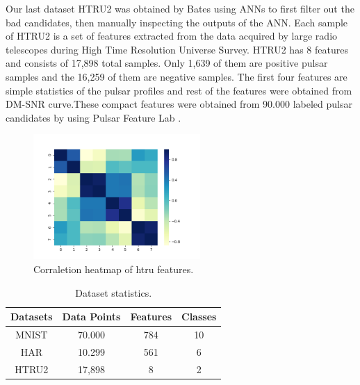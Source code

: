 \documentclass[journal]{IEEEtran}
\begin{document}
  Our last dataset HTRU2 was obtained by Bates\cite{bates2012high} using ANNs to first filter out the bad candidates, then manually inspecting the outputs of the ANN. Each sample of HTRU2 is a set of features extracted from the data acquired by large radio telescopes during High Time Resolution Universe Survey. HTRU2 has 8 features and consists of 17,898 total samples. Only 1,639 of them are positive pulsar samples and the 16,259 of them are negative samples. The first four features are simple statistics of the pulsar profiles and rest of the features were obtained from DM-SNR curve\cite{keith2010high}.These compact features were obtained from 90.000 labeled pulsar candidates by using Pulsar Feature Lab \cite{Lyon2015}.

  \begin{figure}[!ht]
    \centering
    \includegraphics[width=2.5in]{images/cor_heat_htru.png}
    \caption{Corraletion heatmap of htru features.}
    \label{fig_htru}
    \end{figure}
    \par
  
  \begin{table}[!ht]
  \renewcommand{\arraystretch}{1.3}
  \caption{Dataset statistics.}
  \label{tab_datasets}
  \centering
  \begin{tabular}{|c||c|c|c|}
  \hline
  Datasets &    Data Points &  Features &  Classes \\
  \hline
  \hline
  MNIST &    70.000 &   784 &                 10 \\
  \hline
  HAR &       10.299 &   561 &                 6 \\
  \hline
  HTRU2 &    17,898 &   8 &                  2 \\
  \hline
  \end{tabular}
  \end{table}
\end{document}
